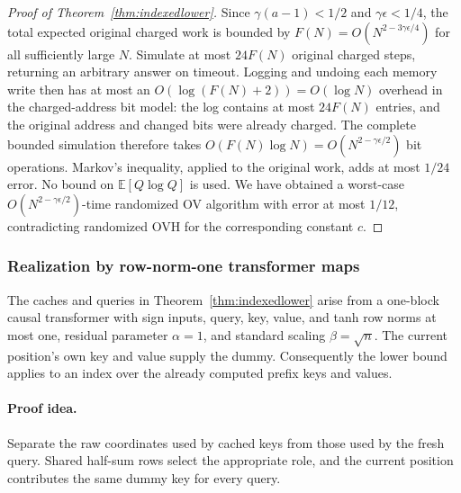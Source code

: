\begin{proof}[Proof of Theorem~\ref{thm:indexedlower}]
Since $\gamma(a-1)<1/2$ and $\gamma\epsilon<1/4$, the total expected
original charged work is bounded by
$F(N)=O(N^{2-3\gamma\epsilon/4})$ for all sufficiently large $N$.
Simulate at most $24F(N)$ original charged steps, returning an
arbitrary answer on timeout.  Logging and undoing each memory write
then has at most an $O(\log(F(N)+2))=O(\log N)$ overhead in the
charged-address bit model: the log contains at most $24F(N)$ entries,
and the original address and changed bits were already charged.
The complete bounded simulation therefore takes
$O(F(N)\log N)=O(N^{2-\gamma\epsilon/2})$ bit operations.
Markov's inequality, applied to the original work, adds at most
$1/24$ error.  No bound on $\mathbb E[Q\log Q]$ is used.
We have obtained a
worst-case $O(N^{2-\gamma\epsilon/2})$-time randomized OV algorithm
with error at most $1/12$, contradicting randomized OVH for the
corresponding constant $c$.
\end{proof}

\subsubsection{Realization by row-norm-one transformer maps}

\begin{corollary}
\label{cor:indexedblock}
The caches and queries in Theorem~\ref{thm:indexedlower} arise from a
one-block causal transformer with sign inputs, query, key, value, and
tanh row norms at most one, residual parameter $\alpha=1$, and
standard scaling $\beta=\sqrt n$.  The current position's own key and
value supply the dummy.  Consequently the lower bound applies to an
index over the already computed prefix keys and values.
\end{corollary}

\paragraph{Proof idea.}
Separate the raw coordinates used by cached keys from those used by the fresh query.  Shared half-sum rows select the appropriate role, and the current position contributes the same dummy key for every query.

